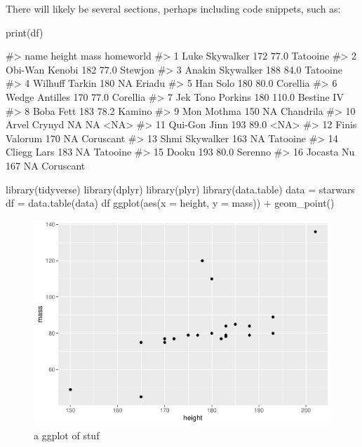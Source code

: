 There will likely be several sections, perhaps including code snippets,
such as:

\begin{Schunk}
\begin{Sinput}
print(df)
\end{Sinput}
\begin{Soutput}
#>                name height  mass  homeworld
#> 1    Luke Skywalker    172  77.0   Tatooine
#> 2    Obi-Wan Kenobi    182  77.0    Stewjon
#> 3  Anakin Skywalker    188  84.0   Tatooine
#> 4    Wilhuff Tarkin    180    NA     Eriadu
#> 5          Han Solo    180  80.0   Corellia
#> 6    Wedge Antilles    170  77.0   Corellia
#> 7  Jek Tono Porkins    180 110.0 Bestine IV
#> 8         Boba Fett    183  78.2     Kamino
#> 9        Mon Mothma    150    NA  Chandrila
#> 10     Arvel Crynyd     NA    NA       <NA>
#> 11     Qui-Gon Jinn    193  89.0       <NA>
#> 12    Finis Valorum    170    NA  Coruscant
#> 13   Shmi Skywalker    163    NA   Tatooine
#> 14      Cliegg Lars    183    NA   Tatooine
#> 15            Dooku    193  80.0    Serenno
#> 16       Jocasta Nu    167    NA  Coruscant
\end{Soutput}
\end{Schunk}

\begin{Schunk}
\begin{Sinput}
library(tidyverse)
library(dplyr)
library(plyr)
library(data.table)
data = starwars %
df = data.table(data)
df %
  ggplot(aes(x = height, 
             y = mass)) +
  geom_point()
\end{Sinput}
\begin{figure}
\includegraphics{Untitled_files/figure-latex/print-the-plot-1} \caption[a ggplot of stuf]{a ggplot of stuf}\label{fig:print-the-plot}
\end{figure}
\end{Schunk}

